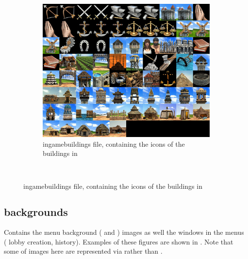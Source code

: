 \begin{appendices}
\begin{figure}
\begin{subfigure}{0.48\textwidth}
            \includegraphics[width=1.0\textwidth]{src/images/ingamebuildings}
            \caption{ingamebuildings file, containing the icons of the buildings in }
            \label{fig:ingamebuildings}
        \end{subfigure}\\%
    \end{figure}

    \subsection{backgrounds}

    Contains the menu background ( and ) images as well the windows in the \aoe{} menus (\eg{} lobby creation, history). Examples of these figures are shown in . Note that some of images here are represented via  rather than .


\end{appendices}
